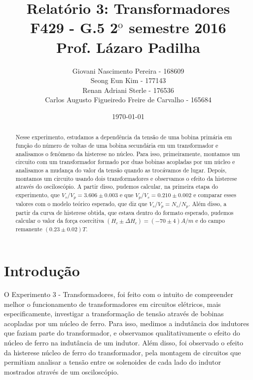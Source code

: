 \documentclass[11pt,a4paper]{article}
\begin{document}
\title{Relatório 3: Transformadores\\
\small{F429 - G.5  2$^{ \underbar{\text{o}} }$ semestre 2016 \\
Prof. Lázaro Padilha }}
\author{Giovani Nascimento Pereira - 168609 \\
Seong Eun Kim - 177143\\
Renan Adriani Sterle - 176536\\
Carlos Augusto Figueiredo Freire de Carvalho - 165684}

\date{\today}
%
%
\maketitle
\begin{abstract}
    Nesse experimento, estudamos a dependência da tensão de uma bobina primária em função do número de voltas de uma bobina secundária em um transformador e analisamos o fenômeno da histerese no núcleo. Para isso, primeiramente, montamos um circuito com um transformador formado por duas bobinas acopladas por um núcleo e analisamos a mudança do valor da tensão quando as trocávamos de lugar. Depois, montamos um circuito usando dois transformadores e observamos o efeito da histerese através do osciloscópio. A partir disso, pudemos calcular, na primeira etapa do experimento, que $V_s/V_p = 3.606 \pm 0.003$ e que $V_p/V_s = 0.210 \pm 0.002$ e comparar esses valores com o modelo teórico esperado, que diz que $V_s/V_p = N_s/N_p$. Além disso, a partir da curva de histerese obtida, que estava dentro do formato esperado, pudemos calcular o valor da força coercitiva $(H_c \pm \Delta H_c) = (-70 \pm 4) A/m$ e do campo remanente $(0.23 \pm 0.02)T$.
    
\end{abstract}

\newpage %
\tableofcontents %
%
%
\newpage
\section{Introdução}
    
    O Experimento 3 - Transformadores, foi feito com o intuito de compreender melhor o funcionamento de transformadores em circuitos elétricos, mais especificamente, investigar a transformação de tensão através de bobinas acopladas por um núcleo de ferro. Para isso, medimos a indutância dos indutores que faziam parte do transformador, e observamos qualitativamente o efeito do núcleo de ferro na indutância de um indutor. 
    Além disso, foi observado o efeito da histerese núcleo de ferro do transformador, pela montagem de circuitos que permitiam analisar a tensão entre os solenoides de cada lado do indutor mostrados através de um osciloscópio.
    
\end{document}
